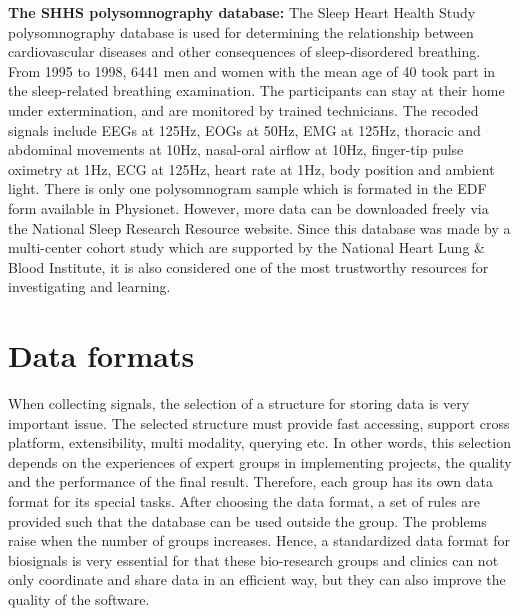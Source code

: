         \textbf{The SHHS polysomnography database: }
        The Sleep Heart Health Study polysomnography database is used for determining the relationship between cardiovascular diseases and other consequences of sleep-disordered breathing. From 1995 to 1998, 6441 men and women with the mean age of 40 took part in the sleep-related breathing examination\citep{SHSH_SleepData}. The participants can stay at their home under extermination, and are monitored by trained technicians. The recoded signals include EEGs at 125Hz, EOGs at 50Hz, EMG at 125Hz, thoracic and abdominal movements at 10Hz, nasal-oral airflow at 10Hz, finger-tip pulse oximetry at 1Hz, ECG at 125Hz, heart rate at 1Hz, body position and ambient light. There is only one polysomnogram sample which is formated in the EDF form available in Physionet. However, more data can be downloaded freely via the National Sleep Research Resource website\citep{SHSH_NationalSleepData}. Since this database was made by a multi-center cohort study which are supported by the National Heart Lung \& Blood Institute, it is also considered one of the most trustworthy resources for investigating and learning.
\section{Data formats}
When collecting signals, the selection of a structure for storing data is very important issue. The selected structure must provide fast accessing, support cross platform, extensibility, multi modality, querying etc. In other words, this selection depends on the experiences of expert groups in implementing projects, the quality and the performance of the final result. Therefore, each group has its own data format for its special tasks. After choosing the data format, a set of rules are provided such that the database can be used outside the group. The problems raise when the number of groups increases. Hence, a standardized data format for biosignals is very essential for that these bio-research groups and clinics can not only coordinate and share data in an efficient way, but they can also improve the quality of the software.\\
